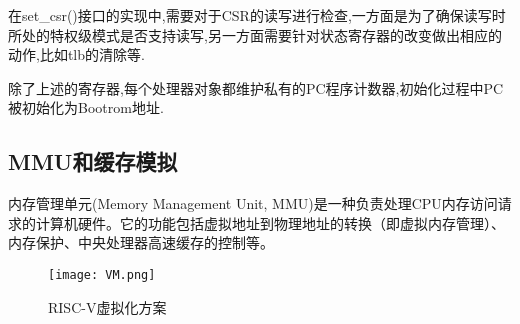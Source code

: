 在set\_csr()接口的实现中,需要对于CSR的读写进行检查,一方面是为了确保读写时所处的特权级模式是否支持读写,另一方面需要针对状态寄存器的改变做出相应的动作,比如tlb的清除等.

除了上述的寄存器,每个处理器对象都维护私有的PC程序计数器,初始化过程中PC被初始化为Bootrom地址.

\subsection{MMU和缓存模拟}

内存管理单元(Memory Management Unit, MMU)是一种负责处理CPU内存访问请求的计算机硬件。它的功能包括虚拟地址到物理地址的转换（即虚拟内存管理）、内存保护、中央处理器高速缓存的控制等。
\begin{figure}[h]
    \centering
    \texttt{[image: VM.png]}
    \caption{RISC-V虚拟化方案}
    \label{fig:VM}
\end{figure}

